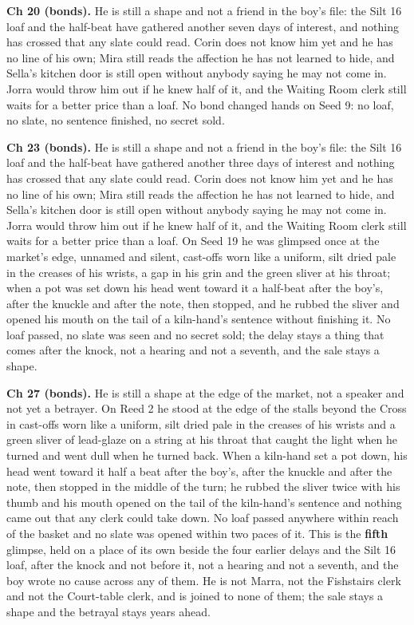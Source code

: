 \documentclass{design/chronicle}
\begin{document}
{\textbf{Ch 20 (bonds).} He is still a shape and not a friend in the boy’s file: the Silt 16 loaf and the half-beat have gathered another seven days of interest, and nothing has crossed that any slate could read. Corin does not know him yet and he has no line of his own; Mira still reads the affection he has not learned to hide, and Sella’s kitchen door is still open without anybody saying he may not come in. Jorra would throw him out if he knew half of it, and the Waiting Room clerk still waits for a better price than a loaf. No bond changed hands on Seed 9: no loaf, no slate, no sentence finished, no secret sold.

\textbf{Ch 23 (bonds).} He is still a shape and not a friend in the boy’s file: the Silt 16 loaf and the half-beat have gathered another three days of interest and nothing has crossed that any slate could read. Corin does not know him yet and he has no line of his own; Mira still reads the affection he has not learned to hide, and Sella’s kitchen door is still open without anybody saying he may not come in. Jorra would throw him out if he knew half of it, and the Waiting Room clerk still waits for a better price than a loaf. On Seed 19 he was glimpsed once at the market’s edge, unnamed and silent, cast-offs worn like a uniform, silt dried pale in the creases of his wrists, a gap in his grin and the green sliver at his throat; when a pot was set down his head went toward it a half-beat after the boy’s, after the knuckle and after the note, then stopped, and he rubbed the sliver and opened his mouth on the tail of a kiln-hand’s sentence without finishing it. No loaf passed, no slate was seen and no secret sold; the delay stays a thing that comes after the knock, not a hearing and not a seventh, and the sale stays a shape.

\textbf{Ch 27 (bonds).} He is still a shape at the edge of the market, not a speaker and not yet a betrayer. On Reed 2 he stood at the edge of the stalls beyond the Cross in cast-offs worn like a uniform, silt dried pale in the creases of his wrists and a green sliver of lead-glaze on a string at his throat that caught the light when he turned and went dull when he turned back. When a kiln-hand set a pot down, his head went toward it half a beat after the boy’s, after the knuckle and after the note, then stopped in the middle of the turn; he rubbed the sliver twice with his thumb and his mouth opened on the tail of the kiln-hand’s sentence and nothing came out that any clerk could take down. No loaf passed anywhere within reach of the basket and no slate was opened within two paces of it. This is the \textbf{fifth} glimpse, held on a place of its own beside the four earlier delays and the Silt 16 loaf, after the knock and not before it, not a hearing and not a seventh, and the boy wrote no cause across any of them. He is not Marra, not the Fishstairs clerk and not the Court-table clerk, and is joined to none of them; the sale stays a shape and the betrayal stays years ahead.

}
\end{document}

